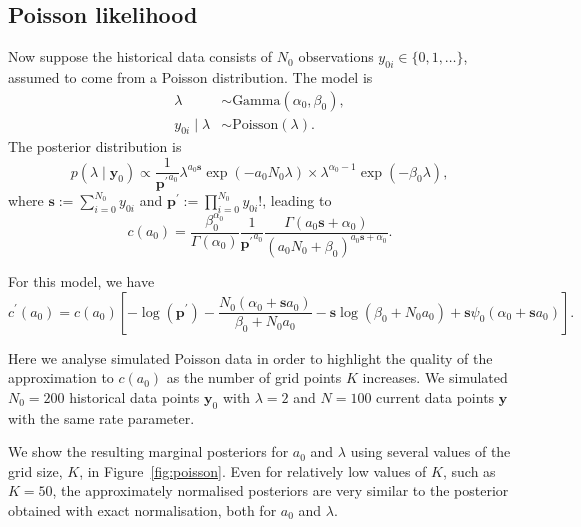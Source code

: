 \documentclass[a4paper, notitlepage, 11pt]{article}
\begin{document}
\subsection{Poisson likelihood}
\label{sec:poisson_illustration}
Now suppose the historical data consists of $N_0$ observations $y_{0i} \in \{0, 1, \ldots \}$, assumed to come from a Poisson distribution.
The model is 
\begin{align*}
 \lambda &\sim \text{Gamma}(\alpha_0, \beta_0),\\
 y_{0i} \mid \lambda &\sim \text{Poisson}(\lambda).
\end{align*}
The posterior distribution is 
\begin{equation}
 p(\lambda \mid \boldsymbol y_0) \propto \frac{1}{\boldsymbol {p^\prime}^{a_0} } \lambda^{a_0\boldsymbol s} \exp(-a_0 N_0 \lambda) \times \lambda^{\alpha_0-1} \exp(-\beta_0\lambda),
\end{equation}
where $\boldsymbol s := \sum_{i=0}^{N_0} y_{0i}$ and $\boldsymbol p^\prime := \prod_{i = 0}^{N_0} y_{0i}!$, leading to
\begin{equation}
 \label{eq:cA0_poisson}
 c(a_0) = \frac{\beta_0^{\alpha_0}}{\Gamma(\alpha_0)}\frac{1}{\boldsymbol {p^\prime}^{a_0} } \frac{\Gamma(a_0\boldsymbol s + \alpha_0)}{\left( a_0N_0 + \beta_0 \right)^{a_0\boldsymbol s + \alpha_0} }.
\end{equation}

For this model, we have
\begin{equation}
 \label{eq:cA0_prime_poisson}
 c^\prime(a_0) = c(a_0) \left[ -\log(\boldsymbol p^\prime) - \frac{N_0 (\alpha_0 + \boldsymbol s a_0) }{\beta_0 + N_0a_0} - \boldsymbol s \log(\beta_0 + N_0a_0) + \boldsymbol s \psi_0(\alpha_0 + \boldsymbol s a_0) \right].
\end{equation}

Here we analyse simulated Poisson data in order to highlight the quality of the approximation to $c(a_0)$ as the number of grid points $K$ increases.
We simulated $N_0 = 200$ historical data points $\boldsymbol y_0$ with $\lambda = 2$ and $N = 100$ current data points $\boldsymbol y$ with the same rate parameter.

We show the resulting marginal posteriors for $a_0$ and $\lambda$ using several values of the grid size, $K$, in Figure~\ref{fig:poisson}.
Even for relatively low values of $K$, such as $K = 50$, the approximately normalised posteriors are very similar to the posterior obtained with exact normalisation, both for $a_0$ and $\lambda$.
\end{document}
